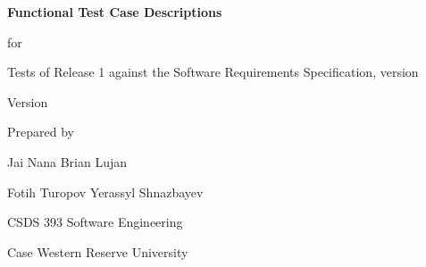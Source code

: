 \begin{titlepage}
  \centering
  \vspace*{3cm}
  {\Huge\bfseries Functional Test Case Descriptions\par}
  \vspace{0.6cm}
  {\LARGE for\par}
  \vspace{0.6cm}
  {\Huge\bfseries \SRSproduct\par}
  \vspace{0.4cm}
  {\Large Tests of Release 1 against the Software Requirements Specification, version \SRSversion\par}
  \vspace{1.5cm}
  {\Large Version \TCDversion\par}
  \vspace{0.4cm}
  {\large \TCDdate\par}
  \vfill
  {\large Prepared by\par}
  {\Large Jai Nana \quad Brian Lujan\par Fotih Turopov \quad Yerassyl Shnazbayev\par}
  \vspace{0.8cm}
  {\large CSDS 393 Software Engineering\par Case Western Reserve University\par}
  \vspace{1cm}
\end{titlepage}

